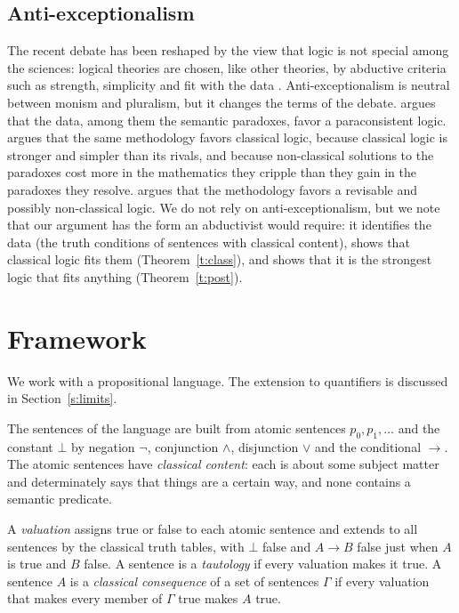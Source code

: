 \documentclass{situationist-preprint}
\begin{document}
\subsection{Anti-exceptionalism}

The recent debate has been reshaped by the view that logic is not special among the sciences: logical theories are chosen, like other theories, by abductive criteria such as strength, simplicity and fit with the data \citep{Priest2014,Hjortland2017,Williamson2017}. Anti-exceptionalism is neutral between monism and pluralism, but it changes the terms of the debate. \citet{Priest2014} argues that the data, among them the semantic paradoxes, favor a paraconsistent logic. \citet{Williamson2017} argues that the same methodology favors classical logic, because classical logic is stronger and simpler than its rivals, and because non-classical solutions to the paradoxes cost more in the mathematics they cripple than they gain in the paradoxes they resolve. \citet{Hjortland2017} argues that the methodology favors a revisable and possibly non-classical logic. We do not rely on anti-exceptionalism, but we note that our argument has the form an abductivist would require: it identifies the data (the truth conditions of sentences with classical content), shows that classical logic fits them (Theorem~\ref{t:class}), and shows that it is the strongest logic that fits anything (Theorem~\ref{t:post}).

\section{Framework}\label{s:frame}

We work with a propositional language. The extension to quantifiers is discussed in Section~\ref{s:limits}.

\begin{definition}\label{d:lang}
The sentences of the language are built from atomic sentences $p_0, p_1, \ldots$ and the constant $\bot$ by negation $\neg$, conjunction $\wedge$, disjunction $\vee$ and the conditional $\to$. The atomic sentences have \emph{classical content}: each is about some subject matter and determinately says that things are a certain way, and none contains a semantic predicate.
\end{definition}

\begin{definition}\label{d:val}
A \emph{valuation} assigns true or false to each atomic sentence and extends to all sentences by the classical truth tables, with $\bot$ false and $A \to B$ false just when $A$ is true and $B$ false. A sentence is a \emph{tautology} if every valuation makes it true. A sentence $A$ is a \emph{classical consequence} of a set of sentences $\Gamma$ if every valuation that makes every member of $\Gamma$ true makes $A$ true.
\end{definition}
\end{document}

